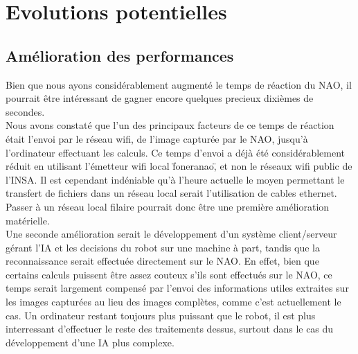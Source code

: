 \section{Evolutions potentielles}
\label{sec:Evolutions potentielles}

  \subsection{Amélioration des performances}
  \label{sub:Améliorations des performances}
    \par Bien que nous ayons considérablement augmenté le temps de réaction du NAO, il pourrait être intéressant de gagner encore quelques precieux dixièmes de secondes.\\
    Nous avons constaté que l'un des principaux facteurs de ce temps de réaction était l'envoi par le réseau wifi, de l'image capturée par le NAO, jusqu'à l'ordinateur effectuant les calculs.
    Ce temps d'envoi a déjà été considérablement réduit en utilisant l'émetteur wifi local \"foneranao\", et non le réseaux wifi public de l'INSA.
    Il est cependant indéniable qu'à l'heure actuelle le moyen permettant le transfert de fichiers dans un réseau local serait l'utilisation de cables ethernet.
    Passer à un réseau local filaire pourrait donc être une première amélioration matérielle.\\
    Une seconde amélioration serait le développement d'un système client/serveur gérant l'IA et les decisions du robot sur une machine à part, tandis que la reconnaissance serait effectuée directement sur le NAO.
    En effet, bien que certains calculs puissent être assez couteux s'ils sont effectués sur le NAO,
    ce temps serait largement compensé par l'envoi des informations utiles extraites sur les images capturées au lieu des images complètes, comme c'est actuellement le cas.
    Un ordinateur restant toujours plus puissant que le robot, il est plus interressant d'effectuer le reste des traitements dessus, surtout dans le cas du développement d'une IA plus complexe.\\

